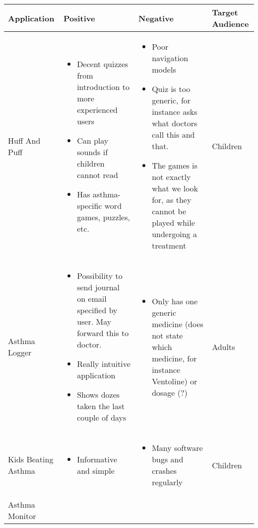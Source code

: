 \begin{sidewaystable}
	\label{tab:existing-product-table}
	\begin{tabular}{ | p{4.0cm} | p{5.5cm} | p{5.5cm} | p{4cm}|}
	\hline
	\textbf{Application} & \textbf{Positive} & \textbf{Negative} & \textbf{Target Audience} \\ \hline
	
   Huff And Puff 
	& 
	\begin{itemize}
	  \item Decent quizzes from introduction to more experienced users
	  \item Can play sounds if children cannot read
	  \item Has asthma-specific word games, puzzles, etc.  
	\end{itemize}
	&
	\begin{itemize}
	  \item Poor navigation models
	  \item Quiz is too generic, for instance asks what doctors call this and that.
	  \item The games is not exactly what we look for, as they cannot be played while undergoing a treatment  
	\end{itemize}
	&
	Children
	\\ \hline
	Asthma Logger
	& 
	\begin{itemize}
	  \item Possibility to send journal on email specified by user. May forward this to doctor.  
	  \item Really intuitive application
	  \item Shows dozes taken the last couple of days
	\end{itemize}
	& 
	\begin{itemize}
	  \item Only has one generic medicine (does not state which medicine, for instance Ventoline) or dosage (?) 
	\end{itemize}
	& 
	Adults
	\\ \hline
	Kids Beating Asthma
	& 
	\begin{itemize}
	  \item Informative and simple
	\end{itemize}
	&
	\begin{itemize}
	  \item Many software bugs and crashes regularly
	\end{itemize}
	& Children
	\\ \hline
	Asthma Monitor
	&
	\begin{itemize}

\end{itemize}
\end{tabular}
\end{sidewaystable}
